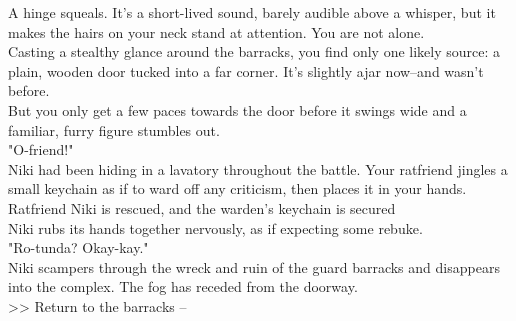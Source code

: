 A hinge squeals. It's a short-lived sound, barely audible above a whisper, but it makes the hairs on your neck stand at attention. You are not alone.\\

Casting a stealthy glance around the barracks, you find only one likely source: a plain, wooden door tucked into a far corner. It's slightly ajar now--and wasn't before.\\

But you only get a few paces towards the door before it swings wide and a familiar, furry figure stumbles out.\\

"O-friend!"\\

Niki had been hiding in a lavatory throughout the battle. Your ratfriend jingles a small keychain as if to ward off any criticism, then places it in your hands.\\
 Ratfriend Niki is rescued, and the warden's keychain is secured\\

Niki rubs its hands together nervously, as if expecting some rebuke.\\

"Ro-tunda? Okay-kay."\\

Niki scampers through the wreck and ruin of the guard barracks and disappears into the complex. The fog has receded from the doorway.\\

>> Return to the barracks -- 
